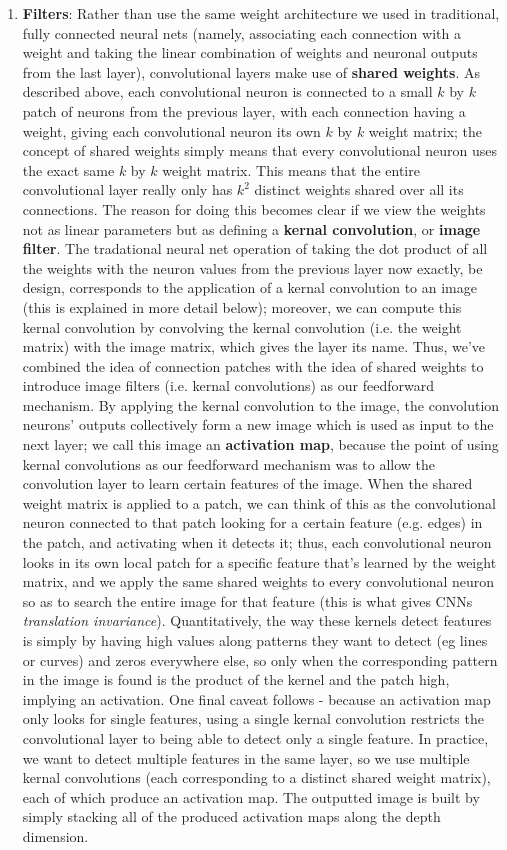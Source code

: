 \documentclass{article}
\begin{document}
\begin{enumerate}
\begin{enumerate}
        \item \textbf{Filters}: Rather than use the same weight architecture we used in traditional, fully connected neural nets (namely, associating each connection with a weight and taking the linear combination of weights and neuronal outputs from the last layer), convolutional layers make use of \textbf{shared weights}. As described above, each convolutional neuron is connected to a small $ k $ by $ k $ patch of neurons from the previous layer, with each connection having a weight, giving each convolutional neuron its own $ k $ by $ k $ weight matrix; the concept of shared weights simply means that every convolutional neuron uses the exact same $ k $ by $ k $ weight matrix. This means that the entire convolutional layer really only has $ k^2 $ distinct weights shared over all its connections. The reason for doing this becomes clear if we view the weights not as linear parameters but as defining a \textbf{kernal convolution}, or \textbf{image filter}. The tradational neural net operation of taking the dot product of all the weights with the neuron values from the previous layer now exactly, be design, corresponds to the application of a kernal convolution to an image (this is explained in more detail below); moreover, we can compute this kernal convolution by convolving the kernal convolution (i.e. the weight matrix) with the image matrix, which gives the layer its name. Thus, we've combined the idea of connection patches with the idea of shared weights to introduce image filters (i.e. kernal convolutions) as our feedforward mechanism. By applying the kernal convolution to the image, the convolution neurons' outputs collectively form a new image which is used as input to the next layer; we call this image an \textbf{activation map}, because the point of using kernal convolutions as our feedforward mechanism was to allow the convolution layer to learn certain features of the image. When the shared weight matrix is applied to a patch, we can think of this as the convolutional neuron connected to that patch looking for a certain feature (e.g. edges) in the patch, and activating when it detects it; thus, each convolutional neuron looks in its own local patch for a specific feature that's learned by the weight matrix, and we apply the same shared weights to every convolutional neuron so as to search the entire image for that feature (this is what gives CNNs \textit{translation invariance}). Quantitatively, the way these kernels detect features is simply by having high values along patterns they want to detect (eg lines or curves) and zeros everywhere else, so only when the corresponding pattern in the image is found is the product of the kernel and the patch high, implying an activation. One final caveat follows - because an activation map only looks for single features, using a single kernal convolution restricts the convolutional layer to being able to detect only a single feature. In practice, we want to detect multiple features in the same layer, so we use multiple kernal convolutions (each corresponding to a distinct shared weight matrix), each of which produce an activation map. The outputted image is built by simply stacking all of the produced activation maps along the depth dimension.

\end{enumerate}
\end{enumerate}
\end{document}
